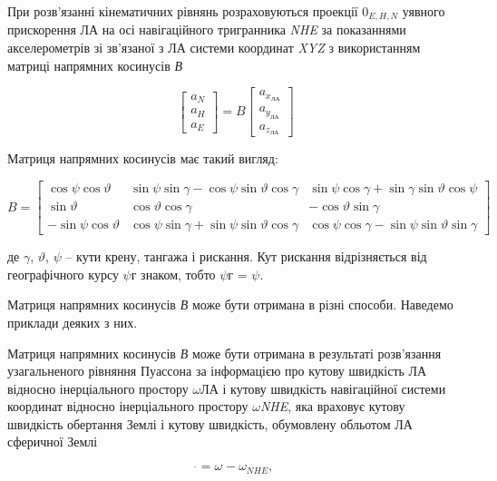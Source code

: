  При розв'язанні кінематичних рівнянь розраховуються проекції \textit{$0_{E,H,N} $ }уявного 
прискорення ЛА на осі навігаційного тригранника \textit{NHE }за показаннями акселерометрів 
зі зв'язаної з ЛА системи координат \textit{XYZ  }з використанням матриці напрямних  
косинусів \textit{В}

\[
 \left[\begin{array}{c} 
{a_{N} } \\ 
{a_{H} } \\ 
{a_{E} }
\end{array}\right]=B
\left[\begin{array}{c} 
{a_{x_{\text{ЛА}} } } \\ 
{a_{y_{\text{ЛА}} } } \\ 
{a_{z_{\text{ЛА}} } } 
\end{array}\right]
\] 

Матриця напрямних  косинусів  має такий вигляд:

\[
  B=\left[\begin{array}{c|c|c} {\cos \psi \cos \vartheta } & {\sin \psi \sin \gamma 
-\cos \psi \sin \vartheta \cos \gamma } & {\sin \psi \cos \gamma +\sin \gamma \sin 
\vartheta \cos \psi } \\  \hline {\sin \vartheta } & {\cos \vartheta \cos \gamma 
} & {-\cos \vartheta \sin \gamma } \\  \hline {-\sin \psi \cos \vartheta } & {\cos 
\psi \sin \gamma +\sin \psi \sin \vartheta \cos \gamma } & {\cos \psi \cos \gamma 
-\sin \psi \sin \vartheta \sin \gamma } \end{array}\right]
\] 



де $\gamma$, $\vartheta$, $\psi$ -- кути крену, тангажа і рискання. Кут рискання 
відрізняється від географічного курсу $\psi$г знаком, тобто $\psi$г = $\psi$.

Матриця 
напрямних  косинусів \textit{В} може бути отримана в різні способи. Наведемо приклади 
деяких з них. 

Матриця напрямних  косинусів \textit{В} може бути отримана в результаті розв'язання 
узагальненого рівняння Пуассона за інформацією про кутову швидкість ЛА відносно інерціального 
простору \textbf{$\omega$}ЛА і кутову швидкість навігаційної системи координат відносно 
інерціального простору \textbf{$\omega$}\textit{NHE}, яка враховує кутову швидкість 
обертання Землі і кутову швидкість, обумовлену обльотом ЛА сферичної Землі 

\[\dot{}=\omega_{} -\omega_{NHE} ,\] 

